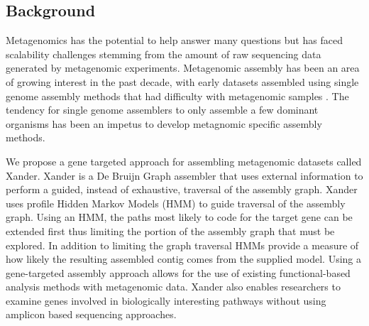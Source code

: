 \documentclass[10pt]{bmc_article}
\newenvironment{bmcformat}{\begin{raggedright}\baselineskip20pt\sloppy\setboolean{publ}{false}}{\end{raggedright}\baselineskip20pt\sloppy}
\begin{document}
\begin{bmcformat}




\section*{Background}
Metagenomics has the potential to help answer many questions but has faced scalability challenges stemming from the amount of raw sequencing data generated by metagenomic experiments\cite{pop_comparative_2004,treangen_repetitive_2011}.  Metagenomic assembly has been an area of growing interest in the past decade, with early datasets assembled using single genome assembly methods that had difficulty with metagenomic samples \cite{venter_environmental_2004,qin_human_2010}. The tendency for single genome assemblers to only assemble a few dominant organisms has been an impetus to develop metagnomic specific assembly methods\cite{namiki_metavelvet:_2012}.

We propose a gene targeted approach for assembling metagenomic datasets called Xander.  Xander is a De Bruijn Graph\cite{de_bruijn_combinatorial_1946} assembler\cite{compeau_how_2011} that uses external information to perform a guided, instead of exhaustive, traversal of the assembly graph.  Xander uses profile Hidden Markov Models (HMM) \cite{eddy_what_2004-1} to guide traversal of the assembly graph. Using an HMM, the paths most likely to code for the target gene can be extended first thus limiting the portion of the assembly graph that must be explored.  In addition to limiting the graph traversal HMMs provide a measure of how likely the resulting assembled contig comes from the supplied model.  Using a gene-targeted assembly approach allows for the use of existing functional-based analysis methods with metagenomic data.  Xander also enables researchers to examine genes involved in biologically interesting pathways without using amplicon based sequencing approaches.


\end{bmcformat}
\end{document}
